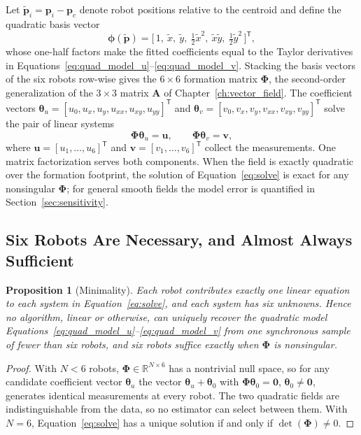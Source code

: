 \documentclass[12pt, letterpaper, oneside]{report}
\newtheorem{proposition}[theorem]{Proposition}
\begin{document}
Let $\tilde{\mathbf{p}}_i=\mathbf{p}_i-\mathbf{p}_c$ denote robot positions
relative to the centroid and define the quadratic basis vector
\begin{equation}
\boldsymbol{\phi}(\tilde{\mathbf{p}}) = \bigl[\,1,\ \tilde x,\ \tilde y,\ \tfrac12\tilde x^2,\ \tilde x\tilde y,\ \tfrac12\tilde y^2\,\bigr]^{\mathsf T},
\label{eq:basis}
\end{equation}
whose one-half factors make the fitted coefficients equal to the Taylor
derivatives in Equations~\eqref{eq:quad_model_u}--\eqref{eq:quad_model_v}.
Stacking the basis vectors of the six robots row-wise gives the
$6\times6$ formation matrix $\boldsymbol{\Phi}$, the second-order
generalization of the $3\times3$ matrix $\mathbf{A}$ of
Chapter~\ref{ch:vector_field}. The coefficient vectors
$\boldsymbol{\theta}_u=[u_0,u_x,u_y,u_{xx},u_{xy},u_{yy}]^{\mathsf T}$ and
$\boldsymbol{\theta}_v=[v_0,v_x,v_y,v_{xx},v_{xy},v_{yy}]^{\mathsf T}$
solve the pair of linear systems
\begin{equation}
\boldsymbol{\Phi}\boldsymbol{\theta}_u = \mathbf{u}, \qquad \boldsymbol{\Phi}\boldsymbol{\theta}_v = \mathbf{v},
\label{eq:solve}
\end{equation}
where $\mathbf{u}=[u_1,\ldots,u_6]^{\mathsf T}$ and
$\mathbf{v}=[v_1,\ldots,v_6]^{\mathsf T}$ collect the measurements. One
matrix factorization serves both components. When the field is exactly
quadratic over the formation footprint, the solution of
Equation~\eqref{eq:solve} is exact for any nonsingular $\boldsymbol{\Phi}$;
for general smooth fields the model error is quantified in
Section~\ref{sec:sensitivity}.

\subsection{Six Robots Are Necessary, and Almost Always Sufficient}

\begin{proposition}[Minimality]
\label{prop:minimality}
Each robot contributes exactly one linear equation to each system in
Equation~\eqref{eq:solve}, and each system has six unknowns. Hence no
algorithm, linear or otherwise, can uniquely recover the quadratic model
Equations~\eqref{eq:quad_model_u}--\eqref{eq:quad_model_v} from one
synchronous sample of fewer than six robots, and six robots suffice
exactly when $\boldsymbol{\Phi}$ is nonsingular.
\end{proposition}

\begin{proof}
With $N<6$ robots, $\boldsymbol{\Phi}\in\mathbb{R}^{N\times6}$ has a
nontrivial null space, so for any candidate coefficient vector
$\boldsymbol{\theta}_u$ the vector
$\boldsymbol{\theta}_u+\boldsymbol{\theta}_0$ with
$\boldsymbol{\Phi}\boldsymbol{\theta}_0=\mathbf{0}$,
$\boldsymbol{\theta}_0\neq\mathbf{0}$, generates identical measurements at
every robot. The two quadratic fields are indistinguishable from the data,
so no estimator can select between them. With $N=6$,
Equation~\eqref{eq:solve} has a unique solution if and only if
$\det(\boldsymbol{\Phi})\neq0$.
\end{proof}
\end{document}
